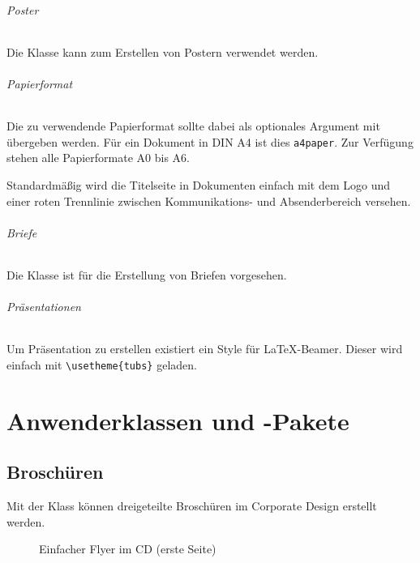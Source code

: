 \documentclass[a4paper,11pt]{tubsreprt}
\begin{document}
\paragraph{Poster}
Die Klasse  kann zum Erstellen von Postern verwendet werden.

\paragraph{Papierformat}
Die zu verwendende Papierformat sollte dabei als optionales Argument mit
übergeben werden. Für ein Dokument in DIN A4 ist dies \texttt{a4paper}.
Zur Verfügung stehen alle Papierformate A0 bis A6.

Standardmäßig wird die Titelseite in Dokumenten einfach mit dem Logo und einer
roten Trennlinie zwischen Kommunikations- und Absenderbereich versehen.

\paragraph{Briefe}

Die Klasse  ist für die Erstellung von Briefen
vorgesehen.

\paragraph{Präsentationen}
Um Präsentation zu erstellen existiert ein Style für \LaTeX-Beamer.
Dieser wird einfach mit \lstinline!\usetheme{tubs}! geladen.

\part{Anwenderklassen und -Pakete}




\chapter{Broschüren}

Mit der Klass  können dreigeteilte Broschüren
im Corporate Design erstellt werden.

\begin{figure}[!ht]
  \caption{Einfacher Flyer im CD (erste Seite)}
\end{figure}
\end{document}
